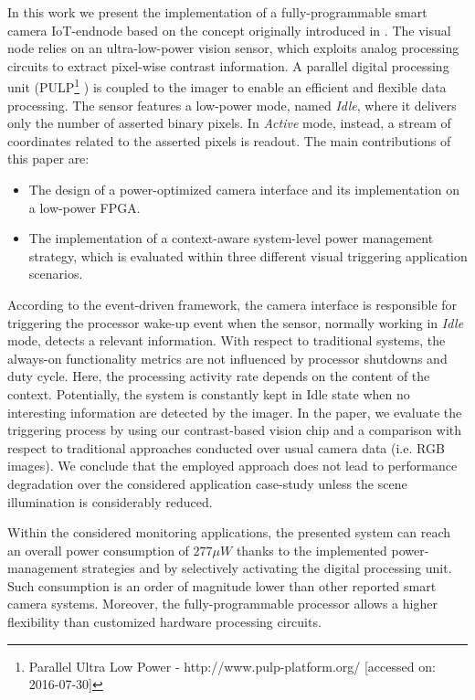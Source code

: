 \documentclass[journal]{IEEEtran}
\begin{document}
In this work we present the implementation of a fully-programmable smart camera IoT-endnode based on the concept originally introduced in \cite{Rusci2016}. The visual node relies on an ultra-low-power vision sensor, which exploits analog processing circuits to extract pixel-wise contrast information. A parallel digital processing unit (PULP\footnote{Parallel Ultra Low Power - http://www.pulp-platform.org/ [accessed on: 2016-07-30]} \cite{PULP}) is coupled to the imager to enable an efficient and flexible data processing. The sensor features a low-power mode, named \textit{Idle}, where it delivers only the number of asserted binary pixels. In \textit{Active} mode, instead, a stream of coordinates related to the asserted pixels is readout. The main contributions of this paper are:
\begin{itemize}
\item The design of a power-optimized camera interface and its implementation on a low-power FPGA.
\item The implementation of a context-aware system-level power management strategy, which is evaluated within three different visual triggering application scenarios.
\end{itemize}

According to the event-driven framework, the camera interface is responsible for triggering the processor wake-up event when the sensor, normally working in \textit{Idle} mode, detects a relevant information.
With respect to traditional systems, the always-on functionality metrics are not influenced by processor shutdowns and duty cycle. Here, the processing activity rate depends on the content of the context. Potentially, the system is constantly kept in Idle state when no interesting information are detected by the imager.
In the paper, we evaluate the triggering process by using our contrast-based vision chip and a comparison with respect to traditional approaches conducted over usual camera data (i.e. RGB images). We conclude that the employed approach does not lead to performance degradation over the considered application case-study unless the scene illumination is considerably reduced.

Within the considered monitoring applications, the presented system can reach an overall power consumption of $277\mu W$ thanks to the implemented power-management strategies and by selectively activating the digital processing unit. Such consumption is an order of magnitude lower than other reported smart camera systems. 
Moreover, the fully-programmable processor allows a higher flexibility than customized hardware processing circuits.
\end{document}
